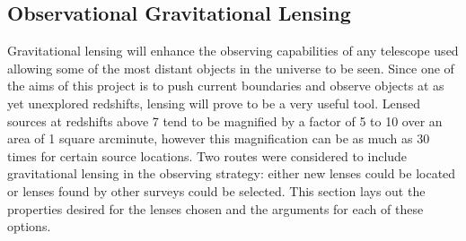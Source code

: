 
\subsection{Observational Gravitational Lensing} %
\label{sec:observational_gravitational_lensing}
	Gravitational lensing will enhance the observing capabilities of any telescope used allowing some of the most distant objects in the universe to be seen. Since one of the aims of this project is to push current boundaries and observe objects at as yet unexplored redshifts, lensing will prove to be a very useful tool. Lensed sources at redshifts above 7 tend to be magnified by a factor of 5 to 10 over an area of 1 square arcminute, however this magnification can be as much as 30 times for certain source locations\cite{magnification}. Two routes were considered to include gravitational lensing in the observing strategy: either new lenses could be located or lenses found by other surveys could be selected. This section lays out the properties desired for the lenses chosen and the arguments for each of these options.

